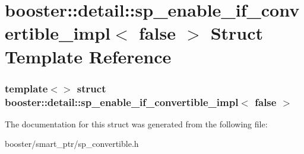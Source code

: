 \section{booster\-:\-:detail\-:\-:sp\-\_\-enable\-\_\-if\-\_\-convertible\-\_\-impl$<$ false $>$ \-Struct \-Template \-Reference}
\label{structbooster_1_1detail_1_1sp__enable__if__convertible__impl_3_01false_01_4}
\subsubsection*{template$<$$>$ struct booster\-::detail\-::sp\-\_\-enable\-\_\-if\-\_\-convertible\-\_\-impl$<$ false $>$}



\-The documentation for this struct was generated from the following file\-:\begin{DoxyCompactItemize}
\item 
booster/smart\-\_\-ptr/sp\-\_\-convertible.\-h\end{DoxyCompactItemize}
